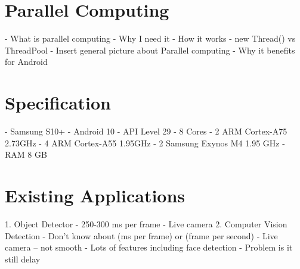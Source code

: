 
    \section{Parallel Computing}
        -	What is parallel computing
        -	Why I need it
        -	How it works
            - new Thread() vs ThreadPool
            - Insert general picture about Parallel computing
        -	Why it benefits for Android


    \section{Specification}
        -	Samsung S10+
        -	Android 10
        -	API Level 29
        -	8 Cores
            - 2 ARM Cortex-A75 2.73GHz
            - 4 ARM Cortex-A55 1.95GHz
            - 2 Samsung Exynos M4 1.95 GHz
        -	RAM 8 GB


    \section{Existing Applications}
        1.	Object Detector
            -	250-300 ms per frame
            -	Live camera
        2.	Computer Vision Detection
            -	Don’t know about (ms per frame) or (frame per second)
            -	Live camera – not smooth
            -	Lots of features including face detection
            -	Problem is it still delay
